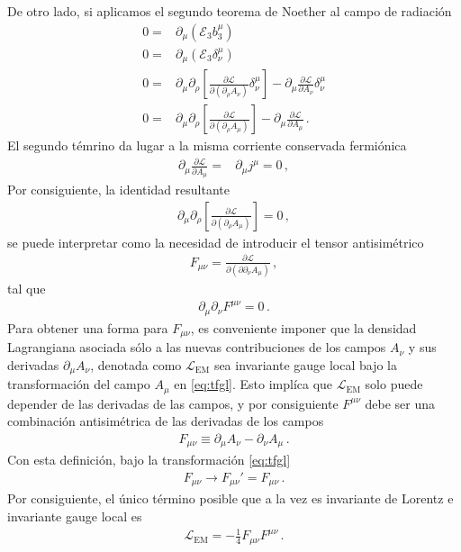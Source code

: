 De otro lado, si aplicamos el segundo teorema de Noether al campo de radiación
\begin{align}
  0=&\partial_{\mu} \left( \mathcal{E}_3 b^{\mu}_3 \right) \nonumber\\
   0=&\partial_{\mu} \left( \mathcal{E}_3 \delta^{\mu}_\nu \right) \nonumber\\
   0=&
 \partial_{\mu} \partial_{\rho} \left[ \frac{\partial \mathcal{L}}{\partial \left(  \partial_{\rho} A_{\nu}\right)}  \delta^{\mu}_\nu \right] - \partial_{\mu} \frac{\partial \mathcal{L}}{\partial A_{\nu}}\delta^{\mu}_{\nu} \nonumber\\
   0=&
 \partial_{\mu} \partial_{\rho}\left[ \frac{\partial \mathcal{L}}{\partial \left(  \partial_{\rho} A_{\mu}\right)}  \right] - \partial_{\mu} \frac{\partial \mathcal{L}}{\partial A_{\mu}} \,.
\end{align}
El segundo témrino da lugar a la misma corriente conservada fermiónica
\begin{align}
  \partial_{\mu} \frac{\partial \mathcal{L}}{\partial A_{\mu}}=&
\partial_{\mu} j^{\mu}=0\,,
\end{align}
Por consiguiente, la identidad resultante
\begin{align}
   \partial_{\mu} \partial_{\rho}\left[ \frac{\partial \mathcal{L}}{\partial \left(  \partial_{\rho} A_{\mu}\right)}  \right]=0\,,
\end{align}
se puede interpretar como la necesidad de introducir el tensor antisimétrico
\begin{align}
  F_{\mu\nu}=\frac{\partial \mathcal{L}}{\partial \left(\partial  \partial_{\nu} A_{\mu}\right)}\,,
\end{align}
tal que
\begin{align}
  \partial_{\mu}\partial_{\nu}F^{\mu\nu}=0\,.
\end{align}
Para obtener una forma para $F_{\mu\nu}$, es conveniente imponer que la densidad Lagrangiana asociada sólo a las nuevas contribuciones de los campos $A_{\nu}$ y sus derivadas $\partial_{\mu}A_{\nu}$, denotada como $\mathcal{L}_{\text{EM}}$ 
sea invariante gauge local bajo la transformación del campo $A_{\mu}$ en \eqref{eq:tfgl}. Esto implíca que $\mathcal{L}_{\text{EM}}$  solo puede depender de las derivadas de las campos, y por consiguiente $F^{\mu\nu}$ debe ser una combinación antisimétrica de las derivadas de los campos
\begin{align}
  F_{\mu\nu}\equiv\partial_{\mu}A_{\nu}-\partial_{\nu}A_{\mu}\,.
\end{align}
Con esta definición, bajo la transformación  \eqref{eq:tfgl}
\begin{align}
  F_{\mu\nu}\to F_{\mu\nu}'=F_{\mu\nu}\,.
\end{align}
Por consiguiente, el único término posible que a la vez es invariante de Lorentz e invariante gauge local es
\begin{align}
  \mathcal{L}_{\text{EM}}=-\frac{1}{4}F_{\mu\nu}F^{\mu\nu}\,.
\end{align}

